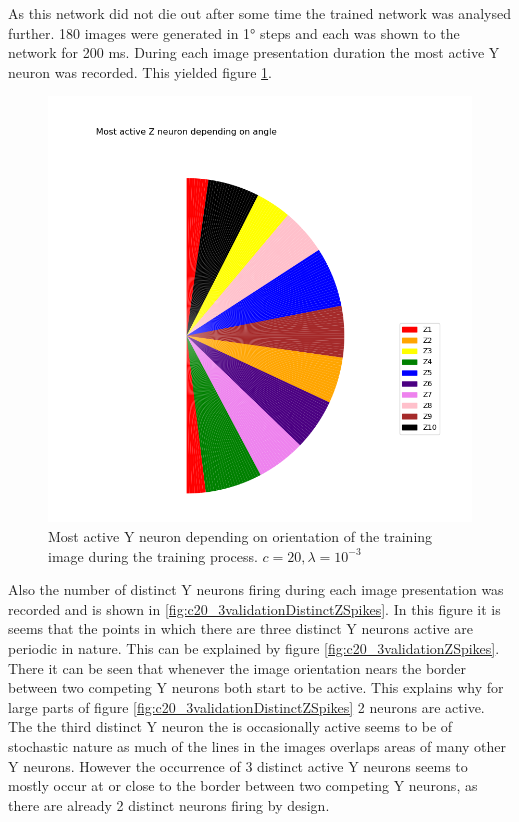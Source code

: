 As this network did not die out after some time the trained network was analysed further. 180 images were generated in 1° steps and each was shown to the network for 200 ms. During each image presentation duration the most active Y neuron was recorded. This yielded figure \ref{fig:c20_3Pie}.

\begin{figure}
  \includegraphics[width=\linewidth]{figures/angleNetwork/c20_3validationPie.png}
  \caption{Most active Y neuron depending on orientation of the training image during the training process. $c = 20, \lambda = 10^{-3}$}
  \label{fig:c20_3Pie}
\end{figure}

Also the number of distinct Y neurons firing during each image presentation was recorded and is shown in \ref{fig:c20_3validationDistinctZSpikes}. In this figure it is seems that the points in which there are three distinct Y neurons active are periodic in nature. This can be explained by figure \ref{fig:c20_3validationZSpikes}. There it can be seen that whenever the image orientation nears the border between two competing Y neurons both start to be active. This explains why for large parts of figure \ref{fig:c20_3validationDistinctZSpikes} 2 neurons are active. The the third distinct Y neuron the is occasionally active seems to be of stochastic nature as much of the lines in the images overlaps areas of many other Y neurons. However the occurrence of 3 distinct active Y neurons seems to mostly occur at or close to the border between two competing Y neurons, as there are already 2 distinct neurons firing by design.

